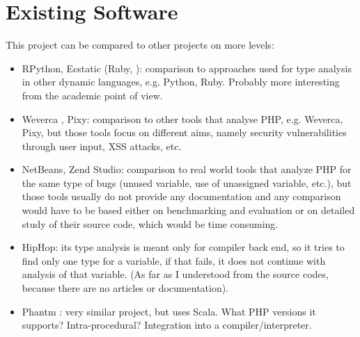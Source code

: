 \chapter{Existing Software}
    This project can be compared to other projects on more levels:
    \begin{itemize}
        \item{RPython, Ecstatic (Ruby, \cite{madsen2007ecstatic}):} comparison to approaches used 
            for type analysis in other dynamic languages, e.g. Python, Ruby. 
            Probably more interesting from the academic point of view.
        \item{Weverca \cite{hauzarhunting}, Pixy\cite{jovanovic2006pixy}:} comparison to other tools that analyse PHP, e.g. Weverca, Pixy, 
            but those tools focus on different aims, namely security vulnerabilities 
            through user input, XSS attacks, etc.
        \item{NetBeans, Zend Studio:} comparison to real world tools that analyze PHP for the same 
            type of bugs (unused variable, use of unassigned variable, etc.), 
            but those tools usually do not provide any documentation and 
            any comparison would have to be based either on benchmarking and 
            evaluation or on detailed study of their source code, which would be 
            time consuming.
        \item{HipHop:} its type analysis is meant only for compiler back end, 
            so it tries to find only one type for a variable, if that fails, 
            it does not continue with analysis of that variable. 
            (As far as I understood from the source codes, because there 
            are no articles or documentation).
        \item{Phantm \cite{kneuss2010using}:} very similar project, but 
            uses Scala. What PHP versions it supports? Intra-procedural? 
            Integration into a compiler/interpreter.
    \end{itemize}    

